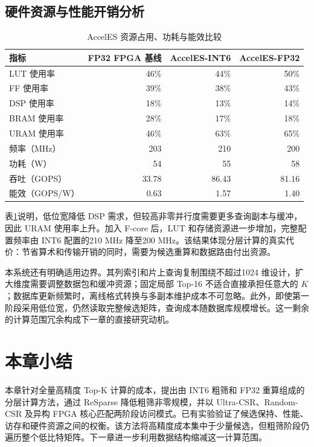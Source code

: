 



\subsection{硬件资源与性能开销分析}
\begin{table}[htbp]\centering
\caption{AccelES 资源占用、功耗与能效比较}\label{tab:acc-resource}
\begin{tabular}{lrrr}\toprule
指标&FP32 FPGA 基线&AccelES-INT6&AccelES-FP32\\\midrule
LUT 使用率&46\%&44\%&50\%\\
FF 使用率&39\%&38\%&43\%\\
DSP 使用率&18\%&13\%&14\%\\
BRAM 使用率&28\%&17\%&18\%\\
URAM 使用率&46\%&63\%&65\%\\
频率（MHz）&203&210&200\\
功耗（W）&54&55&58\\
吞吐（GOPS）&33.78&86.43&81.16\\
能效（GOPS/W）&0.63&1.57&1.40\\\bottomrule
\end{tabular}
\end{table}

表\ref{tab:acc-resource}说明，低位宽降低 DSP 需求，但较高非零并行度需要更多查询副本与缓冲，因此 URAM 使用率上升。加入 F-core 后，LUT 和存储资源进一步增加，完整配置频率由 INT6 配置的210 MHz 降至200 MHz。该结果体现分层计算的真实代价：节省算术和传输开销的同时，需要为候选重算和数据路由付出资源。

本系统还有明确适用边界。其列索引和片上查询复制围绕不超过1024 维设计，扩大维度需要调整数据包和缓冲资源；固定局部 Top-16 不适合直接承担任意大的 $K$；数据库更新频繁时，离线格式转换与多副本维护成本不可忽略。此外，即使第一阶段采用低位宽，仍然读取完整候选矩阵，查询成本随数据库规模增长。这一剩余的计算范围冗余构成下一章的直接研究动机。



\section{本章小结}
本章针对全量高精度 Top-K 计算的成本，提出由 INT6 粗筛和 FP32 重算组成的分层计算方法，通过 ReSparse 降低粗筛非零规模，并以 Ultra-CSR、Random-CSR 及异构 FPGA 核心匹配两阶段访问模式。已有实验验证了候选保持、性能、访存和硬件资源之间的权衡。该方法将高精度成本集中于少量候选，但粗筛阶段仍遍历整个低比特矩阵。下一章进一步利用数据结构缩减这一计算范围。
